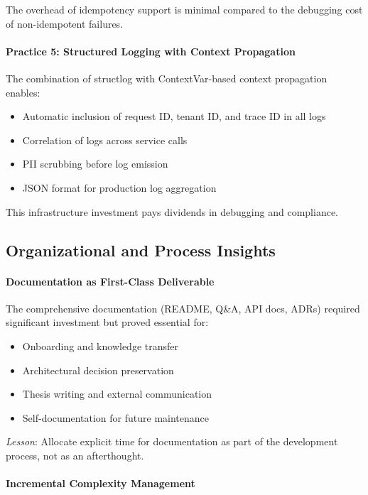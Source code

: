 The overhead of idempotency support is minimal compared to the debugging cost of non-idempotent failures.

\paragraph{Practice 5: Structured Logging with Context Propagation}

The combination of structlog with ContextVar-based context propagation enables:

\begin{itemize}
    \item Automatic inclusion of request ID, tenant ID, and trace ID in all logs
    \item Correlation of logs across service calls
    \item PII scrubbing before log emission
    \item JSON format for production log aggregation
\end{itemize}

This infrastructure investment pays dividends in debugging and compliance.

\subsection{Organizational and Process Insights}

\paragraph{Documentation as First-Class Deliverable}

The comprehensive documentation (README, Q\&A, API docs, ADRs) required significant investment but proved essential for:

\begin{itemize}
    \item Onboarding and knowledge transfer
    \item Architectural decision preservation
    \item Thesis writing and external communication
    \item Self-documentation for future maintenance
\end{itemize}

\textit{Lesson}: Allocate explicit time for documentation as part of the development process, not as an afterthought.

\paragraph{Incremental Complexity Management}

